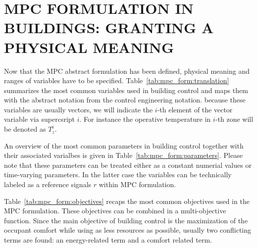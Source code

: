 \documentclass[10pt]{extarticle}
\begin{document}
\section{MPC FORMULATION IN BUILDINGS: GRANTING A PHYSICAL MEANING }

Now that the MPC abstract formulation has been defined, 
physical meaning and ranges of variables have to be specified.
Table~\ref{tab:mpc_form:translation} summarizes the most common
variables used in building control and maps them with the abstract
notation from the control engineering notation. 
because these variables are usually vectors, we will indicate  the
$i$-th element of the vector variable via supercsript $i$.
For instance the operative temperature in $i$-th zone will be denoted as $T_z^i$.

An overview of the most common parameters in building control together with their associated varialbes  is given in Table~\ref{tab:mpc_form:parameters}.
Please note that these parameters can be treated either as a constant numerial values or time-varying parameters. In the latter case the variables can be technically labeled as a reference signals $r$ within MPC formulation.

Table~\ref{tab:mpc_form:objectives} recaps the most common objectives used 
in the MPC formulation. These objectives can be combined in a multi-objective
function. Since the main objective of building control is the maximization of 
the occupant comfort while using as less resources as possible,
usually two conflicting terms are found: an energy-related term
and a comfort related term.   
 
\end{document}
